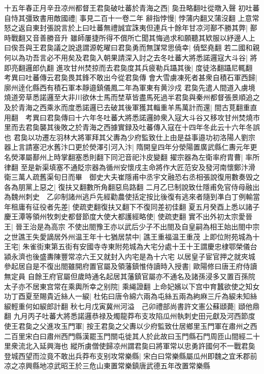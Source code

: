 十五年春正月辛丑凉州都督王君㚟破吐蕃於青海之西|{
	㚟丑略翻吐從暾入聲}
初吐蕃自恃其彊致書用敵國禮|{
	事見二百十一卷二年}
辭指悖慢|{
	悖蒲内翻又蒲沒翻}
上意常怒之返自東封張說言於上曰吐蕃無禮誠宜誅夷但連兵十餘年甘凉河鄯不勝其弊|{
	鄯時戰翻又音善勝音升}
雖師屢捷所得不償所亡聞其悔過求和願聽其欵服以紓邊人上曰俟吾與王君㚟議之說退謂源乾曜曰君㚟勇而無謀常思僥幸|{
	僥堅堯翻}
若二國和親何以為功吾言必不用矣及君㚟入朝果請深入討之去冬吐蕃大將悉諾邏寇大斗谷|{
	將即亮翻邏郎仇翻}
進攻甘州焚掠而去君㚟度其兵疲勒兵躡其後|{
	度徒洛翻躡尼輒翻　考異曰吐蕃傳云君㚟畏其鋒不敢出今從君㚟傳}
會大雪虜凍死者甚衆自積石軍西歸|{
	廓州逹化縣西有積石軍本靜邉鎮儀鳳二年為軍東有黄沙戍}
君㚟先遣人間道入虜境燒道旁草悉諾邏至大非川欲休士馬而埜草皆盡馬死過半君㚟與秦州都督張景順追之及於青海之西乘氷而度悉諾邏已去破其後軍獲其輜重羊馬萬計而還|{
	間古莧翻重直用翻　考異曰君㚟傳曰十六年冬吐蕃大將悉諾邏帥衆入寇大斗谷又移攻甘州焚燒市里而去君㚟襲其後敗之於青海之西據實録及吐蕃傳入寇在十四年冬此云十六年冬誤也}
君㚟以功遷左羽林大將軍拜其父夀為少府監致仕上由是益事邉功初洛陽人劉宗器上言請塞汜水舊汴口更於熒澤引河入汴|{
	隋開皇四年分滎陽置廣武縣仁夀元年更名熒澤屬鄯州上時掌翻塞悉則翻下同汜音祀汴皮變翻}
擢宗器為左衛率府胄曹|{
	率所律翻}
至是新渠填塞不通貶宗器為循州安懷戌主命將作大匠范安及發河南懷鄭汴滑衛三萬人疏舊渠旬日而畢　御史大夫崔隱甫中丞宇文融恐右丞相張說復用數奏毁之各為朋黨上惡之|{
	復扶又翻數所角翻惡烏路翻}
二月乙巳制說致仕隱甫免官侍母融出為魏州刺史　乙卯制諸州逃戶先經勸農使括定按比後復有逃來者隨到凖白丁例輸當年租庸有征役者先差|{
	使疏吏翻復扶又翻下不復同差初佳翻}
夏五月癸酉上悉以諸子慶王潭等領州牧刺史都督節度大使大都護經略使|{
	使疏吏翻}
實不出外初太宗愛晉王|{
	晉王治是為高宗}
不使出閤豫王亦以武后少子不出閤及自皇嗣為相王始出閤中宗之世譙王失愛謫居外州温王年十七猶居禁中|{
	譙王重福温王重茂}
上即位附苑城為十王宅|{
	朱雀街東第五街有安國寺寺東附苑城為大宅分處十王十王謂慶忠棣鄂榮儀台潁永濟也後盛夀陳豐常凉六王又就封入内宅是為十六宅}
以居皇子宦官押之就夾城參起居自是不復出閤雖開府置官屬及領藩鎮惟侍讀時入授書|{
	歐陽修曰唐王府侍讀無定員}
自餘王府官屬但歲時通名起居其藩鎮官屬亦不通名及諸孫浸多又置百孫院太子亦不居東宫常在乘輿所幸之别院|{
	乘䋲證翻}
上命妃嬪以下宫中育蠶欲使之知女功丁酉夏至賜貴近絲人一綟|{
	杜佑曰唐令綿六兩為屯絲五兩為絇麻三斤為綟未知絲綟輕重何如綟郎計翻}
秋七月戊寅冀州河溢　己卯禮部尚書許文憲公蘇頲薨|{
	頲他鼎翻}
九月丙子吐蕃大將悉諾邏恭禄及燭龍莽布支攻陷瓜州執刺史田元獻及河西節度使王君㚟之父進攻玉門軍|{
	按王君㚟之父夀以少府監致仕居鄉里玉門軍在肅州之西二百里宋白曰肅州西門縣漢罷玉門關屯徙其人於此故曰玉門縣石門周匝山間經二十里衆流北入延興海也}
縱所虜僧使歸凉州謂君㚟曰將軍常以忠勇許國何不一戰君㚟登城西望而泣竟不敢出兵莽布支别攻常樂縣|{
	宋白曰常樂縣屬瓜州即魏之宜禾郡前凉之凉興縣地凉武昭王於三危山東置常樂鎮唐武德五年改置常樂縣}

